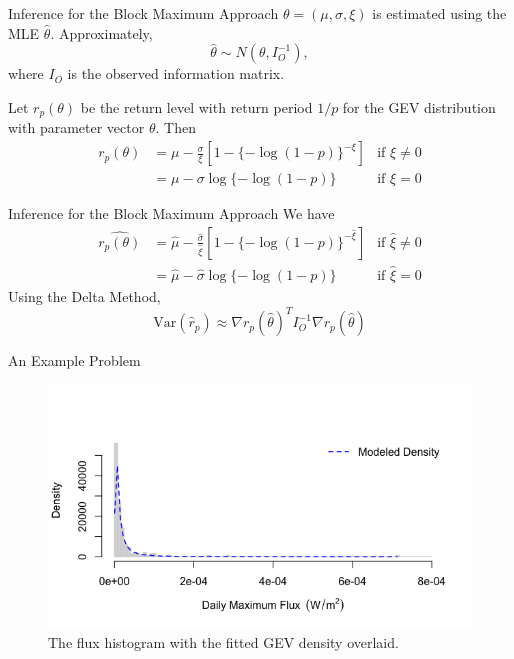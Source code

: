 \documentclass{beamer}
\begin{document}
\begin{frame}{Inference for the Block Maximum Approach}
    $\theta = (\mu, \sigma, \xi)$ is estimated using the MLE $\hat{\theta}$. Approximately,
    \[
    \hat{\theta} \sim N(\theta, I_O^{-1}),
    \]
    where $I_O$ is the observed information matrix.

    Let $r_p(\theta)$ be the return level with return period $1 / p$ for the GEV distribution with parameter vector $\theta$. Then
    \begin{align*}
        r_p(\theta) &= \mu - \frac{\sigma}{\xi}[1 - \{-\log(1 - p)\}^{-\xi}] & \text{if $\xi \ne 0$} \\
        &= \mu - \sigma\log\{-\log(1 - p)\} & \text{if $\xi = 0$}
    \end{align*}
\end{frame}

\begin{frame}{Inference for the Block Maximum Approach}
    We have
    \begin{align*}
        \widehat{r_p(\theta)} &= \hat{\mu} - \frac{\hat{\sigma}}{\hat{\xi}}[1 - \{-\log(1 - p)\}^{-\hat{\xi}}] & \text{if $\hat{\xi} \ne 0$} \\
        &= \hat{\mu} - \hat{\sigma}\log\{-\log(1 - p)\} & \text{if $\hat{\xi} = 0$}
    \end{align*}
    Using the Delta Method,
    \[
    \text{Var}(\hat{r}_p) \approx \nabla r_p(\hat{\theta})^T I_O^{-1}\nabla r_p(\hat{\theta})
    \]
\end{frame}

\begin{frame}{An Example Problem}
    \begin{figure}
        \centering
        \includegraphics[scale=0.5]{daily_max_flux_hist2.png}
        \caption{The flux histogram with the fitted GEV density overlaid.}
        \label{fig:daily_max_flux_hist2}
    \end{figure}
\end{frame}
\end{document}
